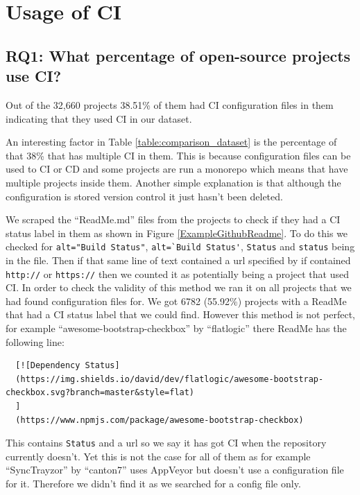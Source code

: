 \documentclass[twoside,12pt,titlepage,a4paper]{article}
\begin{document}
\pagebreak
\section{Usage of CI}

\vspace*{-0.05in}
\subsection{\textbf{RQ1}: What percentage of open-source projects use CI?}
\label{section:RQ1}
\vspace*{-0.05in}

Out of the 32,660 projects 38.51\% of them had CI configuration files in them indicating that they used CI in our dataset. 


An interesting factor in Table \ref{table:comparison_dataset} is the percentage of that 38\% that has multiple CI in them. This is because configuration files can be used to CI or CD and some projects are run a monorepo which means that have multiple projects inside them. Another simple explanation is that although the configuration is stored version control it just hasn't been deleted. 

We scraped the \enquote{ReadMe.md} files from the projects to check if they had a CI status label in them as shown in Figure \ref{ExampleGithubReadme}. To do this we checked for \verb|alt="Build Status"|, \verb|alt=`Build Status'|, \verb|Status| and \verb|status| being in the file. Then if that same line of text contained a url specified by if contained \verb|http://| or \verb|https://| then we counted it as potentially being a project that used CI. In order to check the validity of this method we ran it on all projects that we had found configuration files for. We got 6782 (55.92\%) projects with a ReadMe that had a CI status label that we could find.
However this method is not perfect, for example \enquote{awesome-bootstrap-checkbox} by \enquote{flatlogic} \cite{GithubReadMeIncorrectFind} there ReadMe has the following line:
\begin{verbatim}
  [![Dependency Status]
  (https://img.shields.io/david/dev/flatlogic/awesome-bootstrap-checkbox.svg?branch=master&style=flat)
  ]
  (https://www.npmjs.com/package/awesome-bootstrap-checkbox) 
\end{verbatim}
This contains \verb|Status| and a url so we say it has got CI when the repository currently doesn't. Yet this is not the case for all of them as for example \enquote{SyncTrayzor} by \enquote{canton7} \cite{Male2020} uses AppVeyor but doesn't use a configuration file for it. Therefore we didn't find it as we searched for a config file only. 
\end{document}
